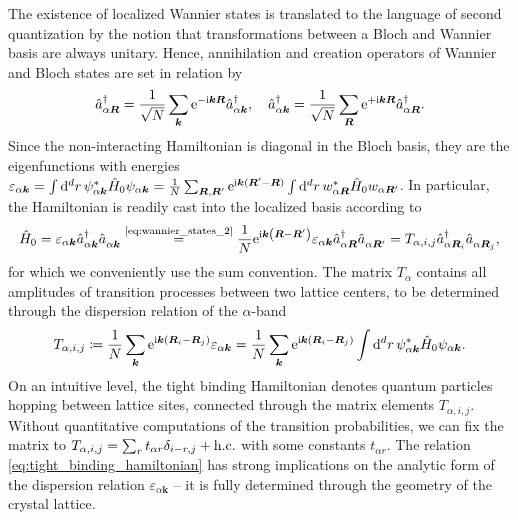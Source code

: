 The existence of localized Wannier states is translated to the language of second quantization by the notion that transformations between a Bloch and Wannier basis are always unitary.
Hence, annihilation and creation operators of Wannier and Bloch states are set in relation by
\begin{align}
    \hat a^\dag_{\alpha{\bm R}} = \frac1{\sqrt N}\sum_{\bm k}\mathrm e^{-\mathrm i{\bm k}{\bm R}}\hat a^\dag_{\alpha{\bm k}},
    \quad
    \hat a^\dag_{\alpha{\bm k}} = \frac1{\sqrt N}\sum_{\bm R}\mathrm e^{+\mathrm i{\bm k}{\bm R}}\hat a^\dag_{\alpha{\bm R}}.
    \label{eq:wannier_states_2}
\end{align}
Since the non-interacting Hamiltonian is diagonal in the Bloch basis, they are the eigenfunctions with energies $\varepsilon_{\alpha{\bm k}} = \int\mathrm d^dr\, \psi_{\alpha{\bm k}}^* \hat H_0 \psi_{\alpha{\bm k}} = \frac1N\sum_{\bm R,\bm R'}\mathrm e^{\mathrm i\bm k(\bm R'-\bm R)}\int\mathrm d^dr\, w_{\alpha{\bm R}}^* \hat H_0 w_{\alpha{\bm R'}}$.
In particular, the Hamiltonian is readily cast into the localized basis according to
\begin{align}
    \hat H_0
    =
    \varepsilon_{\alpha{\bm k}}\hat a^\dag_{\alpha{\bm k}}\hat a^\pdag_{\alpha{\bm k}}
    \overset{\text{\cref{eq:wannier_states_2}}}{=}
    \frac1N
    \re^{\ri{\bm k}\brlr{{\bm R}-{\bm R'}}}
    \varepsilon_{\alpha{\bm k}}
    \hat a^\dag_{\alpha{\bm R}}\hat a^\pdag_{\alpha{\bm R'}}
    =
    T_{\alpha,i,j}
    \hat a^\dag_{\alpha{\bm R}_i}\hat a^\pdag_{\alpha{\bm R}_j},
    \label{eq:tight_binding_hamiltonian}
\end{align}
for which we conveniently use the sum convention.
The matrix $T_{\alpha}$ contains all amplitudes of transition processes between two lattice centers, to be determined through the dispersion relation of the $\alpha$-band
\begin{align}
    T_{\alpha,i,j} \coloneqq \frac1N\sum_{\bm k}\mathrm e^{\mathrm i{\bm k}\left( {\bm R}_i-{\bm R}_j \right)}\varepsilon_{\alpha{\bm k}} = \frac1N\sum_{\bm k}\mathrm e^{\mathrm i{\bm k}\left( {\bm R}_i-{\bm R}_j \right)}\int\mathrm d^dr\, \psi_{\alpha{\bm k}}^* \hat H_0 \psi_{\alpha{\bm k}}.
\end{align}
On an intuitive level, the tight binding Hamiltonian denotes quantum particles hopping between lattice sites, connected through the matrix elements $T_{\alpha,i,j}$.
Without quantitative computations of the transition probabilities, we can fix the matrix to $T_{\alpha,i,j}=\sum_rt_{\alpha r}\delta_{i-r,j} + {\rm h.c.}$ with some constants $t_{\alpha r}$.
The relation \cref{eq:tight_binding_hamiltonian} has strong implications on the analytic form of the dispersion relation $\varepsilon_{\alpha{\bm k}}$ -- it is fully determined through the geometry of the crystal lattice.
